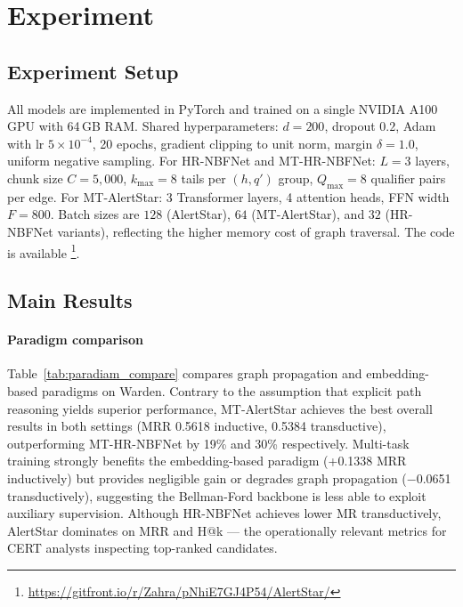 \documentclass[10pt,journal,compsoc]{IEEEtran}
\begin{document}
%
%

\section{Experiment}
\label{sec:experiments}

\subsection{Experiment Setup}
\label{ssec:impl}
All models are implemented in PyTorch and trained on
a single NVIDIA A100 GPU with 64\,GB RAM.
Shared hyperparameters: $d{=}200$, dropout $0.2$,
Adam with lr $5{\times}10^{-4}$, 20 epochs, gradient
clipping to unit norm, margin $\delta{=}1.0$, uniform
negative sampling.
For HR-NBFNet and MT-HR-NBFNet: $L{=}3$ layers,
chunk size $C{=}5{,}000$, $k_{\max}{=}8$ tails per
$(h,q')$ group, $Q_{\max}{=}8$ qualifier pairs per edge.
For MT-AlertStar: 3 Transformer layers, 4 attention
heads, FFN width $F{=}800$.
Batch sizes are $128$ (AlertStar), $64$ (MT-AlertStar),
and $32$ (HR-NBFNet variants), reflecting the higher
memory cost of graph traversal. The code is available \footnote{\url{https://gitfront.io/r/Zahra/pNhiE7GJ4P54/AlertStar/}}.

\subsection{Main Results}
\label{ssec:main_results}

\paragraph*{Paradigm comparison}
Table~\ref{tab:paradiam_compare} compares graph
propagation and embedding-based paradigms on Warden.
Contrary to the assumption that explicit path reasoning
yields superior performance, MT-AlertStar achieves the
best overall results in both settings (MRR 0.5618
inductive, 0.5384 transductive), outperforming
MT-HR-NBFNet by 19\% and 30\% respectively.
Multi-task training strongly benefits the
embedding-based paradigm (+0.1338 MRR inductively)
but provides negligible gain or degrades graph
propagation ($-$0.0651 transductively), suggesting
the Bellman-Ford backbone is less able to exploit
auxiliary supervision. Although HR-NBFNet
achieves lower MR transductively, AlertStar dominates
on MRR and H@k --- the operationally relevant metrics
for CERT analysts inspecting top-ranked candidates.
\end{document}
